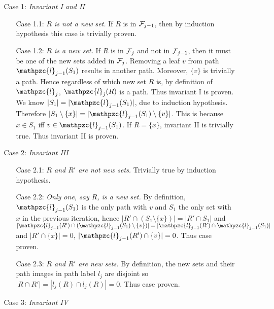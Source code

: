 \documentclass{fsttcs}
\def\cF{{\cal F}}
\def\cl{\mathpzc{l}}
\begin{document}
  \begin{enumerate} %
  \item []
  \begin{enumerate}
  \item [Case 1:] {\em Invariant I and II} 
    \begin{enumerate}
    \item [Case 1.1:] {\em $R$ is not a new set.} If $R$ is in
      $\cF_{j-1}$, then by induction hypothesis this case is trivially
      proven.
    \item [Case 1.2:] {\em $R$ is a new set.} If $R$ is in $\cF_{j}$
      and not in $\cF_{j-1}$, then it must be one of the new sets
      added in $\cF_j$. Removing a leaf $v$ from path $\cl_{j-1}(S_1)$
      results in another path. Moreover, $\{v\}$ is trivially a
      path. Hence regardless of which new set $R$ is, by definition of
      $\cl_j$, $\cl_{j}(R)$ is a path. Thus invariant I is proven.\\
      We know $|S_1| = |\cl_{j-1}(S_1)|$, due to induction
      hypothesis. Therefore $|S_1 \setminus \{x\}| = |\cl_{j-1}(S_1)
      \setminus \{v\}|$. This is because $x \in S_1$ iff $v \in
      \cl_{j-1}(S_1)$. If $R = \{x\}$, invariant II is trivially
      true. Thus invariant II is proven.
  \end{enumerate}
  \item [Case 2:] {\em Invariant III}
    \begin{enumerate}
    \item [Case 2.1:] {\em $R$ and $R'$ are not new sets.} Trivially
      true by induction hypothesis.
    \item [Case 2.2:] {\em Only one, say $R$, is a new set.}  By
      definition, $\cl_{j-1}(S_1)$ is the only path with $v$ and $S_1$
      the only set with $x$ in the previous iteration, hence $|R' \cap
      (S_1 \setminus \{x\})| = |R' \cap S_1|$ and $|\cl_{j-1}(R') \cap
      (\cl_{j-1}(S_1) \setminus \{v\})| = |\cl_{j-1}(R') \cap
      \cl_{j-1}(S_1)|$ and $|R' \cap \{x\}| = 0$, $|\cl_{j-1}(R') \cap
      \{v\}| = 0$. Thus case proven.
    \item [Case 2.3:] {\em $R$ and $R'$ are new sets.} By definition,
      the new sets and their path images in path label $l_j$ are
      disjoint so $|R \cap R'| = |l_j(R) \cap l_j(R)| = 0$. Thus case
      proven.
    \end{enumerate}
  \item [Case 3:] {\em Invariant IV}
    \begin{enumerate}

\end{enumerate}
\end{enumerate}
\end{enumerate}
\end{document}

